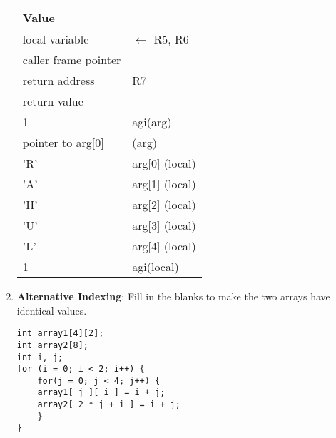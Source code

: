 \documentclass{article}
\begin{document}
\begin{enumerate}[label=(\alph*)]
\begin{center}
\begin{tabular}{|p{3cm} p{3cm} |} 
\hline
 Value &   \\ [0.5ex]
 \hline\hline
\hline
local variable  & $\xleftarrow{}$ R5, R6 \\
\hline 
caller frame pointer & \\
\hline 
return address &     R7\\
\hline 
return value & \\
\hline
 1    & agi(arg) \\
\hline
 pointer to arg[0] & (arg) \\
 \hline
 'R' & arg[0] (local)\\
 \hline
 'A' & arg[1] (local) \\
 \hline
 'H' & arg[2] (local) \\
 \hline
 'U' & arg[3] (local)\\ [1ex]
 \hline
 'L' & arg[4] (local) \\ [1ex]
  \hline
 1 & agi(local) \\[1ex]
  \hline
 
\end{tabular}
\end{center}
\newpage

\item \textbf{Alternative Indexing}: Fill in the blanks to make the two arrays have identical values.

\begin{lstlisting}[style=CStyle] 
int array1[4][2];
int array2[8];
int i, j;
for (i = 0; i < 2; i++) {
    for(j = 0; j < 4; j++) {
    array1[ j ][ i ] = i + j;
    array2[ 2 * j + i ] = i + j;
    }
}
\end{lstlisting}
\end{enumerate}
\newpage
\end{document}
